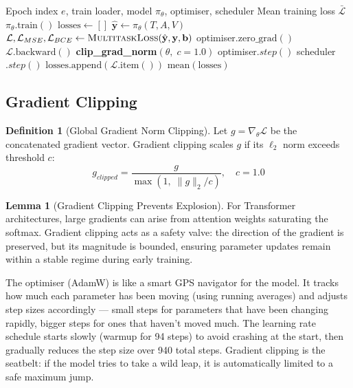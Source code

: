 \documentclass[12pt,a4paper]{article}
\theoremstyle{definition}
\newtheorem{lemma}[theorem]{Lemma}
\newtheorem{definition}[theorem]{Definition}
\begin{document}
\begin{algorithm}[H]
\caption{\textsc{TrainEpoch} — Single Training Epoch}
\label{alg:train_epoch}
\begin{algorithmic}[1]
\Require Epoch index $e$, train loader, model $\pi_\theta$, optimiser, scheduler
\Ensure Mean training loss $\bar{\mathcal{L}}$
\State $\pi_\theta.\text{train}()$ 
\State $\text{losses} \gets []$
  \State $\hat{\mathbf{y}} \gets \pi_\theta(T, A, V)$ 
  \State $\mathcal{L}, \mathcal{L}_{MSE}, \mathcal{L}_{BCE} \gets \textsc{MultitaskLoss}(\hat{\mathbf{y}}, \mathbf{y}, \mathbf{b})$
  \State optimiser$.\text{zero\_grad}()$
  \State $\mathcal{L}.\text{backward}()$ 
  \State \textbf{clip\_grad\_norm}$(\theta,\; c=1.0)$ 
  \State optimiser$.step()$
  \State scheduler$.step()$
  \State $\text{losses}.\text{append}(\mathcal{L}.\text{item}())$
\EndFor
\State \Return $\text{mean}(\text{losses})$
\end{algorithmic}
\end{algorithm}

\subsection{Gradient Clipping}

\begin{definition}[Global Gradient Norm Clipping]
Let $g = \nabla_\theta \mathcal{L}$ be the concatenated gradient vector. Gradient clipping scales $g$ if its $\ell_2$ norm exceeds threshold $c$:
$$g_{clipped} = \frac{g}{\max\!\left(1,\; \|g\|_2 / c\right)}, \quad c = 1.0$$
\end{definition}

\begin{lemma}[Gradient Clipping Prevents Explosion]
For Transformer architectures, large gradients can arise from attention weights saturating the softmax. Gradient clipping acts as a safety valve: the direction of the gradient is preserved, but its magnitude is bounded, ensuring parameter updates remain within a stable regime during early training.
\end{lemma}

\begin{laymanbox}
The optimiser (AdamW) is like a smart GPS navigator for the model. It tracks how much each parameter has been moving (using running averages) and adjusts step sizes accordingly — small steps for parameters that have been changing rapidly, bigger steps for ones that haven't moved much. The learning rate schedule starts slowly (warmup for 94 steps) to avoid crashing at the start, then gradually reduces the step size over 940 total steps. Gradient clipping is the seatbelt: if the model tries to take a wild leap, it is automatically limited to a safe maximum jump.
\end{laymanbox}
\end{document}
